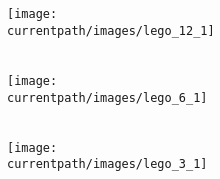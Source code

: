 \begin{activite}
        \partie[]
        \begin{minipage}{0.36\linewidth}
            \begin{center}
                \texttt{[image: \\currentpath/images/lego\_12\_1]}\\ [2.5mm]
                \makebox[\linewidth]{\dotfill} \\ [2.5mm]
                \makebox[\linewidth]{\dotfill} 
            \end{center}
        \end{minipage}
        \hspace{15mm}
        \begin{minipage}{0.3\linewidth}
            \begin{center}
                \texttt{[image: \\currentpath/images/lego\_6\_1]}\\ [2.5mm]
                \makebox[\linewidth]{\dotfill} \\ [2.5mm]
                \makebox[\linewidth]{\dotfill}
            \end{center}
        \end{minipage}
        \hspace{15mm}
        \begin{minipage}{0.3\linewidth}
            \begin{center}
                \texttt{[image: \\currentpath/images/lego\_3\_1]} \\ [2.5mm]
                \makebox[\linewidth]{\dotfill} \\ [2.5mm]
                \makebox[\linewidth]{\dotfill}
            \end{center}
        \end{minipage}       
\end{activite}
 
 